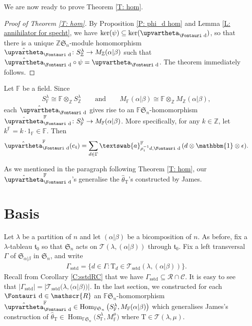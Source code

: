 \documentclass[pdftex]{sigma}
\renewcommand{\t}{\mathfrak{t}}
\renewcommand{\a}{\textswab{a}}
\newcommand{\TT}{\mathscr{T}}
\newcommand{\TTS}{\mathscr{T}_\mathrm{sstd}}
\newcommand{\T}{\mathrm{T}}
\newcommand{\Hom}{\operatorname{Hom}}
\newcommand{\sym}[1]{\mathfrak{S}_{#1}}
\newcommand{\F}{\mathbb{F}}
\newcommand{\bb}[1]{\mathbbm{{#1}}}
\newcommand{\R}{\mathscr{R}}
\newcommand{\C}{\mathscr{C}}
\newcommand{\dR}{\text{\Fontauri d}}
\newcommand{\Z}{\mathbb{Z}}
\newcommand{\Jhom}{\upvartheta}
\newcommand{\hJhom}{\hat{\Jhom}}
\begin{document}
We are now ready to prove Theorem \ref{T: hom}.

\begin{proof}[Proof of Theorem \ref{T: hom}]
By Proposition \ref{P: phi_d hom} and Lemma \ref{L: annihilator for specht}, we have $\ker(\psi) \subseteq \ker(\Jhom_{\dR})$, so that there is a unique $\Z\sym{n}$-module homomorphism $\hJhom_{\dR}\colon S_\Z^\lambda \to M_\Z(\alpha|\beta)$ such that $\hJhom_{\dR} \circ \psi = \Jhom_{\dR}$. The theorem immediately follows.
\end{proof}

Let $\F$ be a field. Since
\begin{gather*}
S_\F^{\lambda} \cong \F \otimes_{\mathbb{Z}} S_\Z^{\lambda} \qquad \text{and} \qquad M_\F(\alpha|\beta) \cong \F \otimes_{\mathbb{Z}} M_\Z(\alpha|\beta),
\end{gather*}
each $\hJhom_{\dR}$ gives rise to an $\F\sym{n}$-homomorphism $\hJhom_{\dR}^{\F} \colon S_\F^{\lambda} \to M_\F(\alpha|\beta)$. More specifically, for any $k \in \mathbb{Z}$, let $k^{\F} =k \cdot 1_{\F} \in \F$. Then
\begin{gather*}\hJhom_{\dR}^{\F} (e_{\t}) = \sum_{d\in\Gamma} \a_{\rho_{\t}^{-1}d,\dR}^{\F} \,(d \otimes \bb{1} \otimes \epsilon).\end{gather*}

As we mentioned in the paragraph following Theorem \ref{T: hom}, our $\hJhom_{\dR}^{\F}$'s generalise the $\hat{\theta}_{\T}$'s constructed by James.

\section{Basis} \label{S:basis?}

Let $\lambda$ be a partition of $n$ and let $(\alpha|\beta)$ be a bicomposition of $n$. As before, fix a $\lambda$-tableau $\t_0$ so that $\sym{n}$ acts on $\TT(\lambda,(\alpha|\beta))$ through $\t_0$. Fix a left transversal $\Gamma$ of $\sym{\alpha|\beta}$ in $\sym{n}$, and write \begin{gather*}\Gamma_{\mathrm{sstd}}=\{ d \in \Gamma \colon \T_d \in \TTS(\lambda, (\alpha|\beta)) \}.\end{gather*} Recall from Corollary \ref{C:sstdRC} that we have $\Gamma_{\mathrm{sstd}}\subseteq \R\cap \C$. It is easy to see that $|\Gamma_{\mathrm{sstd}}|=|\TTS(\lambda,(\alpha|\beta))|$.
In the last section, we constructed for each $\dR \in \R$ an $\F\sym{n}$-homomorphism $\hJhom_{\dR}^{\F} \in \Hom_{\F\sym{n}}\big(S_\F^\lambda,M_\F(\alpha|\beta)\big)$ which generalises James's construction of $\hat{\theta}_{\T} \in \Hom_{\F\sym{n}}\big(S_\F^\lambda,M_\F^{\mu}\big)$ where $\T \in \TT(\lambda,\mu)$.
\end{document}
